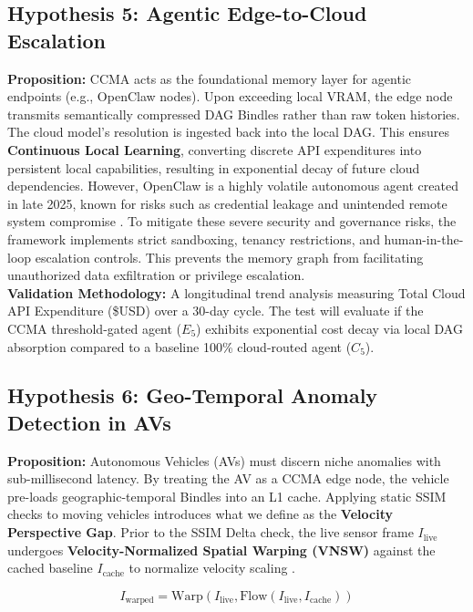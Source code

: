 \documentclass[11pt, a4paper]{article}
\begin{document}
	\subsection{Hypothesis 5: Agentic Edge-to-Cloud Escalation}
	\textbf{Proposition:} CCMA acts as the foundational memory layer for agentic endpoints (e.g., OpenClaw nodes). Upon exceeding local VRAM, the edge node transmits semantically compressed DAG Bindles rather than raw token histories. The cloud model's resolution is ingested back into the local DAG. This ensures \textbf{Continuous Local Learning}, converting discrete API expenditures into persistent local capabilities, resulting in exponential decay of future cloud dependencies. However, OpenClaw is a highly volatile autonomous agent created in late 2025, known for risks such as credential leakage and unintended remote system compromise \cite{openclaw2025}. To mitigate these severe security and governance risks, the framework implements strict sandboxing, tenancy restrictions, and human-in-the-loop escalation controls. This prevents the memory graph from facilitating unauthorized data exfiltration or privilege escalation.\\
	\textbf{Validation Methodology:} A longitudinal trend analysis measuring Total Cloud API Expenditure (\$USD) over a 30-day cycle. The test will evaluate if the CCMA threshold-gated agent ($E_5$) exhibits exponential cost decay via local DAG absorption compared to a baseline 100\% cloud-routed agent ($C_5$).
	
	\subsection{Hypothesis 6: Geo-Temporal Anomaly Detection in AVs}
	\textbf{Proposition:} Autonomous Vehicles (AVs) must discern niche anomalies with sub-millisecond latency. By treating the AV as a CCMA edge node, the vehicle pre-loads geographic-temporal Bindles into an L1 cache. Applying static SSIM checks to moving vehicles introduces what we define as the \textbf{Velocity Perspective Gap}. Prior to the SSIM Delta check, the live sensor frame $I_{\text{live}}$ undergoes \textbf{Velocity-Normalized Spatial Warping (VNSW)} against the cached baseline $I_{\text{cache}}$ to normalize velocity scaling \cite{dosovitskiy2015flownet}.
	
	\begin{equation}
		I_{\text{warped}} = \text{Warp}(I_{\text{live}}, \text{Flow}(I_{\text{live}}, I_{\text{cache}}))
	\end{equation}
	
\end{document}
